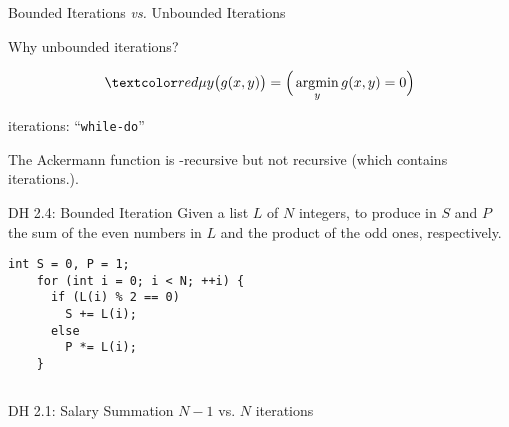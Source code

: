\begin{frame}{}
  \centerline{\LARGE Bounded Iterations \emph{vs.} Unbounded Iterations}

  \vspace{0.80cm}

  \vspace{0.40cm}
  \pause
  \centerline{\Large {} Why unbounded iterations?}
\end{frame}

\begin{frame}{}

  \vspace{0.20cm}
  \[
    \red{\mu} y \big(g(x, y)\big) = \Big(\argmin_{y} g(x,y) = 0\Big)
  \]

  \pause
  \centerline{ iterations: ``\texttt{while-do}''}

  \vspace{0.40cm}
  \pause
  \begin{theorem}
    The Ackermann function is \red{$\mu$}-recursive but not  recursive (which contains  iterations.).
  \end{theorem}
\end{frame}

\begin{frame}[fragile]{}
  \begin{exampleblock}{DH 2.4: Bounded Iteration}
    Given a list $L$ of $N$ integers,
    to produce in $S$ and $P$ the sum of the even numbers in $L$ and the product of the odd ones, respectively.
  \end{exampleblock}

  \pause
  \begin{lstlisting}[style = Cstyle]
    int S = 0, P = 1;
    for (int i = 0; i < N; ++i) {
      if (L(i) % 2 == 0)
        S += L(i);
      else
        P *= L(i);
    }
  \end{lstlisting}

  \begin{columns}
    \pause
      \begin{exampleblock}{DH 2.1: Salary Summation}
	$N-1$ vs. $N$ iterations
      \end{exampleblock}
    \pause
  \end{columns}
\end{frame}

